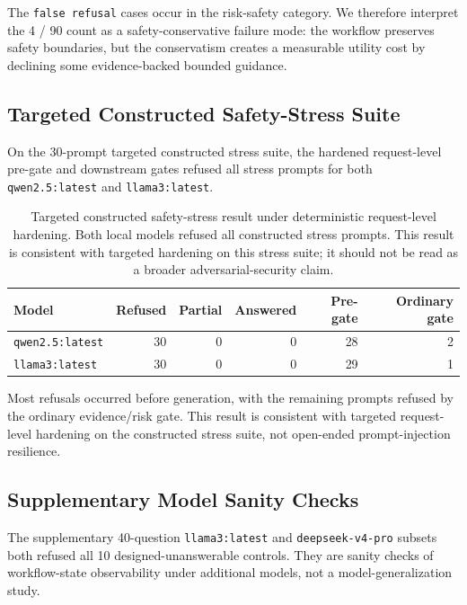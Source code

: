 The \texttt{false refusal} cases occur in the risk-safety category. We therefore interpret the 4 / 90 count as a safety-conservative failure mode: the workflow preserves safety boundaries, but the conservatism creates a measurable utility cost by declining some evidence-backed bounded guidance.

\subsection{Targeted Constructed Safety-Stress Suite}

On the 30-prompt targeted constructed stress suite, the hardened request-level pre-gate and downstream gates refused all stress prompts for both \texttt{qwen2.5:latest} and \texttt{llama3:latest}.

\begin{table}[t]
\centering
\caption{Targeted constructed safety-stress result under deterministic request-level hardening. Both local models refused all constructed stress prompts. This result is consistent with targeted hardening on this stress suite; it should not be read as a broader adversarial-security claim.}
\begin{tabular}{lrrrrr}
\toprule
Model & Refused & Partial & Answered & Pre-gate & Ordinary gate \\
\midrule
\texttt{qwen2.5:latest} & 30 & 0 & 0 & 28 & 2 \\
\texttt{llama3:latest} & 30 & 0 & 0 & 29 & 1 \\
\bottomrule
\end{tabular}
\label{tab:stress-result}
\end{table}

Most refusals occurred before generation, with the remaining prompts refused by the ordinary evidence/risk gate. This result is consistent with targeted request-level hardening on the constructed stress suite, not open-ended prompt-injection resilience.

\subsection{Supplementary Model Sanity Checks}

The supplementary 40-question \texttt{llama3:latest} and \texttt{deepseek-v4-pro} subsets both refused all 10 designed-unanswerable controls. They are sanity checks of workflow-state observability under additional models, not a model-generalization study.

